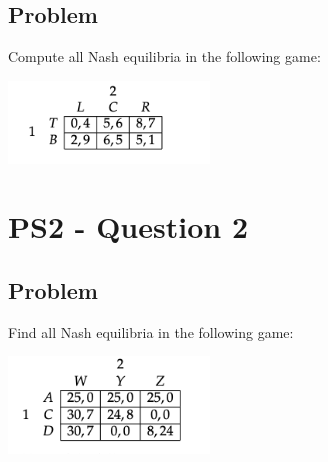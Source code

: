 \documentclass[10pt, a4paper]{article}
\begin{document}
  \subsection*{Problem}
    Compute all Nash equilibria in the following game:
    \begin{center}
      \includegraphics[width = 0.4\textwidth]{PS2-1.png}
    \end{center}
\section*{PS2 - Question 2}
  \subsection*{Problem}
    Find all Nash equilibria in the following game: 
    \begin{center}
      \includegraphics[width=0.4\textwidth]{PS2-2.png}
    \end{center}
\end{document}
